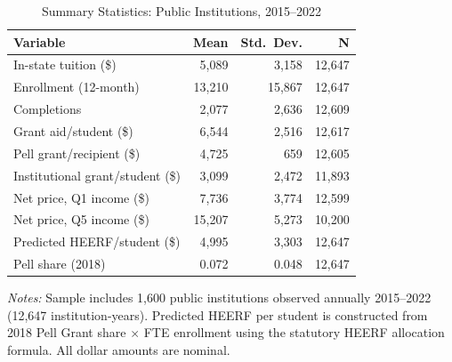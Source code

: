 \begin{table}[H]
\centering
\caption{Summary Statistics: Public Institutions, 2015--2022}
\begin{threeparttable}
\begin{tabular}{lrrr}
\toprule
Variable & Mean & Std.\ Dev. & N \\
\midrule
In-state tuition (\$) & 5,089 & 3,158 & 12,647 \\
Enrollment (12-month) & 13,210 & 15,867 & 12,647 \\
Completions & 2,077 & 2,636 & 12,609 \\
Grant aid/student (\$) & 6,544 & 2,516 & 12,617 \\
Pell grant/recipient (\$) & 4,725 & 659 & 12,605 \\
Institutional grant/student (\$) & 3,099 & 2,472 & 11,893 \\
Net price, Q1 income (\$) & 7,736 & 3,774 & 12,599 \\
Net price, Q5 income (\$) & 15,207 & 5,273 & 10,200 \\
Predicted HEERF/student (\$) & 4,995 & 3,303 & 12,647 \\
Pell share (2018) & 0.072 & 0.048 & 12,647 \\
\bottomrule
\end{tabular}
\begin{tablenotes}[flushleft]
\small
\item \textit{Notes:} Sample includes 1,600 public institutions observed annually 2015--2022 (12,647 institution-years). Predicted HEERF per student is constructed from 2018 Pell Grant share $\times$ FTE enrollment using the statutory HEERF allocation formula. All dollar amounts are nominal.
\end{tablenotes}
\end{threeparttable}
\label{tab:summary}
\end{table}
